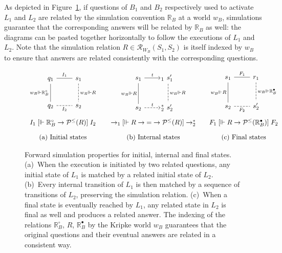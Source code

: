 \documentclass[11pt,oneside]{book}
\theoremstyle{definition}
\newcommand{\ifr}[1]{\mathrel{[{#1}]}}
\newcommand{\que}{\circ}         %
\newcommand{\ans}{\bullet}       %
\begin{document}
As depicted in Figure~\ref{fig:fsim},
if questions of $B_1$ and $B_2$
respectively used to activate $L_1$ and $L_2$
are related by the simulation convention $\mathbb{R}_B$
at a world $w_B$,
simulations guarantee that the corresponding answers will be related
by $\mathbb{R}_B$ as well:
the diagrams
can be pasted together horizontally
to follow the executions of $L_1$ and $L_2$.
Note that
the simulation relation $R \in \mathcal{R}_{W_B}(S_1, S_2)$
is itself indexed by $w_B$
to ensure that answers
are related consistently with the corresponding questions.

\begin{figure} %
  \[
    \begin{array}{c@{\qquad}c@{\qquad}c}
      \begin{tikzcd}[row sep=large]
        q_1 \ar[d, "w_B \Vdash \mathbb{R}_B^\que"', dash] \ar[r, dash, "I_1"] &
        s_1 \ar[d, "w_B \Vdash R", dash, dashed] \\
        q_2 \ar[r, "I_2"', dash, dashed] &
        s_2
      \end{tikzcd}
      &
      \begin{tikzcd}[row sep=large]
        s_1 \ar[r, "t"] \ar[d, "w_B \Vdash R"', dash] &
        \!\!{}_1 \:\, s_1' \ar[d, "w_B \Vdash R", dash, dashed] \\
        s_2 \ar[r, "t", dashed] &
        \!\!{}_2^* \:\, s_2'
      \end{tikzcd}
      &
      \begin{tikzcd}[row sep=large]
        s_1 \ar[r, "F_1", dash] \ar[d, "w_B \Vdash R"', dash] &
        r_1 \ar[d, "w_B \Vdash \mathbb{R}_B^\ans", dash, dashed] \\
        s_2 \ar[r, "F_2"', dash, dashed] &
        s_2'
      \end{tikzcd}
      \\[3.5em]
      I_1 \ifr{\Vdash \mathbb{R}_B^\que \rightarrow \mathcal{P}^\le(R)} I_2
      &
      {\rightarrow_1}
      \ifr{\Vdash R \rightarrow {=} \rightarrow \mathcal{P}^\le(R)}
      {\rightarrow_2^*}
      &
      F_1
      \ifr{\Vdash R \rightarrow \mathcal{P}^\le(\mathbb{R}_B^\ans)}
      F_2
      \\[1em]
      \text{(a) Initial states} &
      \text{(b) Internal states} &
      \text{(c) Final states}
    \end{array}
  \]
  \caption[Forward simulation properties]%
   {Forward simulation properties for initial, internal and final states.
    (a)~When the execution is initiated by two related questions,
    any initial state of $L_1$ is matched by
    a related initial state of $L_2$.
    (b)~Every internal transition of $L_1$ is then matched by
    a sequence of transitions of $L_2$,
    preserving the simulation relation.
    (c)~When a final state is eventually reached by $L_1$,
    any related state in $L_2$ is final as well and
    produces a related answer.
    The indexing of the relations
    $\mathbb{R}_B^\que$, $R$, $\mathbb{R}_B^\ans$
    by the Kripke world $w_B$
    guarantees that the original questions and their eventual answers
    are related in a consistent way.}
  \label{fig:fsim}
\end{figure}
\end{document}

